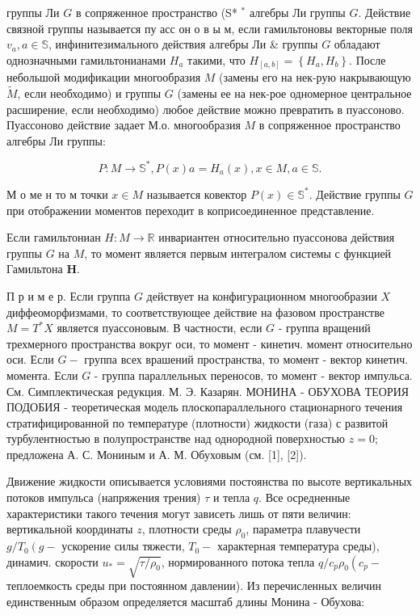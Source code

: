 \documentclass[10pt]{article}
\begin{document}
группы Ли $G$ в сопряженное пространство (S* ${ }^{*}$ алгебры Ли группы $G$. Действие связной группы называется пу асс он о в ы м, если гамильтоновы векторные поля $v_{a}, a \in \mathbb{S}$, инфинитезимального действия алгебры Ли \& группы $G$ обладают однозначными гамильтонианами $H_{a}$ такими, что $H_{[a, b]}=\left\{H_{a}, H_{b}\right\}$. После небольшой модификации многообразия $M$ (замены его на нек-рую накрывающую $\tilde{M}$, если необходимо) и группы $G$ (замены ее на нек-рое одномерное центральное расширение, если необходимо) любое действие можно превратить в пуассоново. Пуассоново действие задает М.о. многообразия $M$ в сопряженное пространство алгебры Ли группы:



\[

P: M \rightarrow \mathbb{S}^{*}, P(x) a=H_{a}(x), x \in M, a \in \mathbb{S} .

\]



М о ме н то м точки $x \in M$ называется ковектор $P(x) \in \mathbb{S}^{*}$. Действие группы $G$ при отображении моментов переходит в коприсоединенное представление.



Если гамильтониан $H: M \rightarrow \mathbb{R}$ инвариантен относительно пуассонова действия группы $G$ на $M$, то момент является первым интегралом системы с функцией Гамильтона $\boldsymbol{H}$.



П р и м е р. Если группа $G$ действует на конфигурационном многообразии $X$ диффеоморфизмами, то соответствующее действие на фазовом пространстве $M=T^{*} X$ является пуассоновым. В частности, если $G$ - группа вращений трехмерного пространства вокруг оси, то момент - кинетич. момент относительно оси. Если $G-$ группа всех врашений пространства, то момент - вектор кинетич. момента. Если $G$ - группа параллельных переносов, то момент - вектор импульса. См. Симплектическая редукция. М. Э. Казарян. МОНИНА - ОБУХОВА ТЕОРИЯ ПОДОБИЯ - теоретическая модель плоскопараллельного стационарного течения стратифицированной по температуре (плотности) жидкости (газа) с развитой турбулентностью в полупространстве над однородной поверхностью $z=0$; предложена А. С. Мониным и А. М. Обуховым (см. [1], [2]).



Движение жидкости описывается условиями постоянства по высоте вертикальных потоков импульса (напряжения трения) $\tau$ и тепла $q$. Все осредненные характеристики такого течения могут зависеть лишь от пяти величин: вертикальной координаты $z$, плотности среды $\rho_{0}$, параметра плавучести $g / T_{0}\left(g-\right.$ ускорение силы тяжести, $T_{0}-$ характерная температура среды), динамич. скорости $u_{*}=\sqrt{\tau / \rho_{0}}$, нормированного потока тепла $q / c_{p} \rho_{0}\left(c_{p}-\right.$ теплоемкость среды при постоянном давлении). Из перечисленных величин единственным образом определяется масштаб длины Монина - Обухова:
\end{document}
